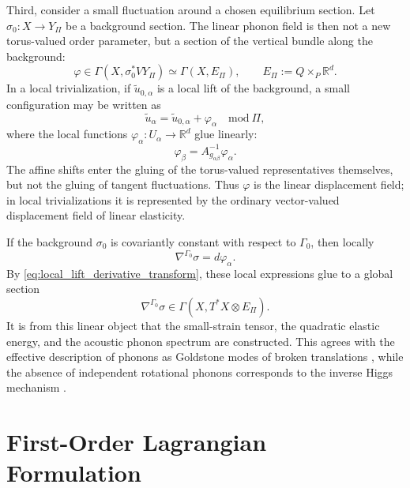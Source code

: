 \documentclass[11pt]{amsart}
\theoremstyle{plain}
\theoremstyle{definition}
\theoremstyle{remark}
\begin{document}
Third, consider a small fluctuation around a chosen equilibrium section. 
Let \(\sigma_0:X\to Y_\Pi\) be a background section. 
The linear phonon field is then not a new torus-valued order parameter, but a section of the vertical bundle along the background:
\begin{equation}
	\varphi\in\Gamma(X,\sigma_0^*VY_\Pi)
	\simeq
	\Gamma(X,E_\Pi),
	\qquad
	E_\Pi:=Q\times_P\mathbb R^d.
	\label{eq:linear_fluctuation_section}
\end{equation}
In a local trivialization, if \(\widetilde u_{0,\alpha}\) is a local lift of the background, a small configuration may be written as
\begin{equation}
	\widetilde u_\alpha
	=
	\widetilde u_{0,\alpha}+\varphi_\alpha
	\quad
	\mathrm{mod}\ \Pi,
	\label{eq:linearization_torus_exp}
\end{equation}
where the local functions \(\varphi_\alpha:U_\alpha\to\mathbb R^d\) glue linearly:
\[
\varphi_\beta
=
A_{g_{\alpha\beta}}^{-1}\varphi_\alpha.
\]
The affine shifts enter the gluing of the torus-valued representatives themselves, but not the gluing of tangent fluctuations. 
Thus \(\varphi\) is the linear displacement field; in local trivializations it is represented by the ordinary vector-valued displacement field of linear elasticity.

If the background \(\sigma_0\) is covariantly constant with respect to \(\Gamma_0\), then locally
\[
\nabla^{\Gamma_0}\sigma
=
d\varphi_\alpha .
\]
By \eqref{eq:local_lift_derivative_transform}, these local expressions glue to a global section
\begin{equation}
	\nabla^{\Gamma_0}\sigma
	\in
	\Gamma(X,T^*X\otimes E_\Pi).
	\label{eq:flat_cov_diff_lift}
\end{equation}
It is from this linear object that the small-strain tensor, the quadratic elastic energy, and the acoustic phonon spectrum are constructed. 
This agrees with the effective description of phonons as Goldstone modes of broken translations \cite{LeutwylerPhonons,WatanabeMurayama2013,BraunerBook,HayataHidaka2014}, while the absence of independent rotational phonons corresponds to the inverse Higgs mechanism \cite{IvanovOgievetsky1975,LowManohar,BraunerInverseHiggs}.

\section{First-Order Lagrangian Formulation}
\label{sec:first_order_lagrangian}
\end{document}
